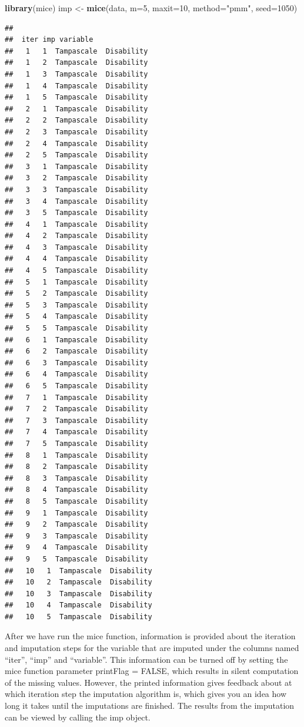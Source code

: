 \documentclass[]{book}
\newenvironment{Shaded}{\begin{snugshade}}{\end{snugshade}}
\newcommand{\KeywordTok}[1]{\textcolor[rgb]{0.13,0.29,0.53}{\textbf{#1}}}
\newcommand{\DataTypeTok}[1]{\textcolor[rgb]{0.13,0.29,0.53}{#1}}
\newcommand{\DecValTok}[1]{\textcolor[rgb]{0.00,0.00,0.81}{#1}}
\newcommand{\StringTok}[1]{\textcolor[rgb]{0.31,0.60,0.02}{#1}}
\newcommand{\NormalTok}[1]{#1}
\theoremstyle{definition}
\theoremstyle{definition}
\theoremstyle{definition}
\theoremstyle{remark}
\begin{document}
\begin{Shaded}
\begin{Highlighting}[]
\KeywordTok{library}\NormalTok{(mice)}
\NormalTok{imp <-}\StringTok{ }\KeywordTok{mice}\NormalTok{(data, }\DataTypeTok{m=}\DecValTok{5}\NormalTok{, }\DataTypeTok{maxit=}\DecValTok{10}\NormalTok{, }\DataTypeTok{method=}\StringTok{"pmm"}\NormalTok{, }\DataTypeTok{seed=}\DecValTok{1050}\NormalTok{)}
\end{Highlighting}
\end{Shaded}

\begin{verbatim}
## 
##  iter imp variable
##   1   1  Tampascale  Disability
##   1   2  Tampascale  Disability
##   1   3  Tampascale  Disability
##   1   4  Tampascale  Disability
##   1   5  Tampascale  Disability
##   2   1  Tampascale  Disability
##   2   2  Tampascale  Disability
##   2   3  Tampascale  Disability
##   2   4  Tampascale  Disability
##   2   5  Tampascale  Disability
##   3   1  Tampascale  Disability
##   3   2  Tampascale  Disability
##   3   3  Tampascale  Disability
##   3   4  Tampascale  Disability
##   3   5  Tampascale  Disability
##   4   1  Tampascale  Disability
##   4   2  Tampascale  Disability
##   4   3  Tampascale  Disability
##   4   4  Tampascale  Disability
##   4   5  Tampascale  Disability
##   5   1  Tampascale  Disability
##   5   2  Tampascale  Disability
##   5   3  Tampascale  Disability
##   5   4  Tampascale  Disability
##   5   5  Tampascale  Disability
##   6   1  Tampascale  Disability
##   6   2  Tampascale  Disability
##   6   3  Tampascale  Disability
##   6   4  Tampascale  Disability
##   6   5  Tampascale  Disability
##   7   1  Tampascale  Disability
##   7   2  Tampascale  Disability
##   7   3  Tampascale  Disability
##   7   4  Tampascale  Disability
##   7   5  Tampascale  Disability
##   8   1  Tampascale  Disability
##   8   2  Tampascale  Disability
##   8   3  Tampascale  Disability
##   8   4  Tampascale  Disability
##   8   5  Tampascale  Disability
##   9   1  Tampascale  Disability
##   9   2  Tampascale  Disability
##   9   3  Tampascale  Disability
##   9   4  Tampascale  Disability
##   9   5  Tampascale  Disability
##   10   1  Tampascale  Disability
##   10   2  Tampascale  Disability
##   10   3  Tampascale  Disability
##   10   4  Tampascale  Disability
##   10   5  Tampascale  Disability
\end{verbatim}

After we have run the mice function, information is provided about the
iteration and imputation steps for the variable that are imputed under
the columns named ``iter'', ``imp'' and ``variable''. This information
can be turned off by setting the mice function parameter printFlag =
FALSE, which results in silent computation of the missing values.
However, the printed information gives feedback about at which iteration
step the imputation algorithm is, which gives you an idea how long it
takes until the imputations are finished. The results from the
imputation can be viewed by calling the imp object.
\end{document}
